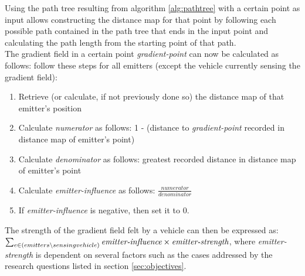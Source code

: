 Using the path tree resulting from algorithm \ref{alg:pathtree} with a certain point as input allows constructing the distance map for that point by following each possible path contained in the path tree that ends in the input point and calculating the path length from the starting point of that path.
\\
The gradient field in a certain point \emph{gradient-point} can now be calculated as follows: follow these steps for all emitters (except the vehicle currently sensing the gradient field):
\begin{enumerate}
    \item Retrieve (or calculate, if not previously done so) the distance map of that emitter's position
    \item Calculate \emph{numerator} as follows: 1 - (distance to \emph{gradient-point} recorded in distance map of emitter's point)
    \item Calculate \emph{denominator} as follows: greatest recorded distance in distance map of emitter's point
    \item Calculate \emph{emitter-influence} as follows: $\frac{numerator}{denominator}$
    \item If \emph{emitter-influence} is negative, then set it to 0.
\end{enumerate}

\noindent
The strength of the gradient field felt by a vehicle can then be expressed as: 
\\ $\sum\nolimits_{e \in (emitters \setminus sensing vehicle)} \emph{emitter-influence} \times \emph{emitter-strength}$, where \emph{emitter-strength} is dependent on several factors such as the cases addressed by the research questions listed in section \ref{sec:objectives}.

